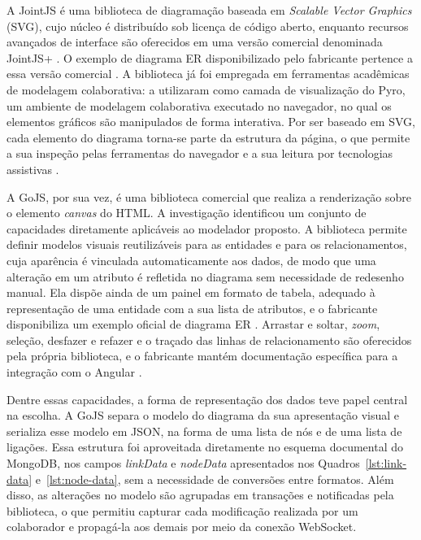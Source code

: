 A JointJS é uma biblioteca de diagramação baseada em \textit{Scalable Vector Graphics} (SVG), cujo núcleo é distribuído sob licença de código aberto, enquanto recursos avançados de interface são oferecidos em uma versão comercial denominada JointJS+ \cite{JointJS2026}. O exemplo de diagrama ER disponibilizado pelo fabricante pertence a essa versão comercial \cite{JointJSDemos}. A biblioteca já foi empregada em ferramentas acadêmicas de modelagem colaborativa:  a utilizaram como camada de visualização do Pyro, um ambiente de modelagem colaborativa executado no navegador, no qual os elementos gráficos são manipulados de forma interativa. Por ser baseado em SVG, cada elemento do diagrama torna-se parte da estrutura da página, o que permite a sua inspeção pelas ferramentas do navegador e a sua leitura por tecnologias assistivas \cite{KorenIvancevic2026}.

A GoJS, por sua vez, é uma biblioteca comercial que realiza a renderização sobre o elemento \textit{canvas} do HTML. A investigação identificou um conjunto de capacidades diretamente aplicáveis ao modelador proposto. A biblioteca permite definir modelos visuais reutilizáveis para as entidades e para os relacionamentos, cuja aparência é vinculada automaticamente aos dados, de modo que uma alteração em um atributo é refletida no diagrama sem necessidade de redesenho manual. Ela dispõe ainda de um painel em formato de tabela, adequado à representação de uma entidade com a sua lista de atributos, e o fabricante disponibiliza um exemplo oficial de diagrama ER \cite{GoJSERSample}. Arrastar e soltar, \textit{zoom}, seleção, desfazer e refazer e o traçado das linhas de relacionamento são oferecidos pela própria biblioteca, e o fabricante mantém documentação específica para a integração com o Angular \cite{GoJS2024}.

Dentre essas capacidades, a forma de representação dos dados teve papel central na escolha. A GoJS separa o modelo do diagrama da sua apresentação visual e serializa esse modelo em JSON, na forma de uma lista de nós e de uma lista de ligações. Essa estrutura foi aproveitada diretamente no esquema documental do MongoDB, nos campos \textit{linkData} e \textit{nodeData} apresentados nos Quadros~\ref{lst:link-data} e~\ref{lst:node-data}, sem a necessidade de conversões entre formatos. Além disso, as alterações no modelo são agrupadas em transações e notificadas pela biblioteca, o que permitiu capturar cada modificação realizada por um colaborador e propagá-la aos demais por meio da conexão WebSocket.

